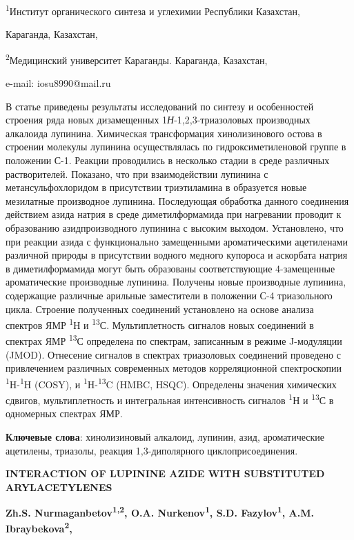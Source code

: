 \textsuperscript{1}Институт органического синтеза и углехимии Республики
Казахстан,

Караганда, Казахстан,

\textsuperscript{2}Медицинский университет Караганды. Караганда,
Казахстан,

e-mail: iosu8990@mail.ru

В статье приведены результаты исследований по синтезу и особенностей
строения ряда новых дизамещенных 1\emph{Н}-1,2,3-триазоловых производных
алкалоида лупинина. Химическая трансформация хинолизинового остова в
строении молекулы лупинина осуществлялась по гидроксиметиленовой группе
в положении С-1. Реакции проводились в несколько стадии в среде
различных растворителей. Показано, что при взаимодействии лупинина с
метансульфохлоридом в присутствии триэтиламина в образуется новые
мезилатные производное лупинина. Последующая обработка данного
соединения действием азида натрия в среде диметилформамида при
нагревании проводит к образованию азидпроизводного лупинина с высоким
выходом. Установлено, что при реакции азида с функционально замещенными
ароматическими ацетиленами различной природы в присутствии водного
медного купороса и аскорбата натрия в диметилформамида могут быть
образованы соответствующие 4-замещенные ароматические производные
лупинина. Получены новые производные лупинина, содержащие различные
арильные заместители в положении С-4 триазольного цикла. Строение
полученных соединений установлено на основе анализа спектров ЯМР
\textsuperscript{1}Н и \textsuperscript{13}С. Мультиплетность сигналов
новых соединений в спектрах ЯМР \textsuperscript{13}С определена по
спектрам, записанным в режиме J-модуляции (JMOD). Отнесение сигналов в
спектрах триазоловых соединений проведено с привлечением различных
современных методов корреляционной спектроскопии
\textsuperscript{1}H-\textsuperscript{1}H (COSY), и
\textsuperscript{1}H-\textsuperscript{13}C (HMBC, HSQC). Определены
значения химических сдвигов, мультиплетность и интегральная
интенсивность сигналов \textsuperscript{1}Н и \textsuperscript{13}С в
одномерных спектрах ЯМР.

\textbf{Ключевые слова}: хинолизиновый алкалоид, лупинин, азид,
ароматические ацетилены, триазолы, реакция 1,3-диполярного
циклоприсоединения.

\textbf{INTERACTION OF LUPININE AZIDE WITH SUBSTITUTED ARYLACETYLENES}

\textbf{Zh.S. Nurmaganbetov\textsuperscript{1,2}, O.A.
Nurkenov\textsuperscript{1}, S.D. Fazylov\textsuperscript{1}, A.M.
Ibraybekova\textsuperscript{2},}


